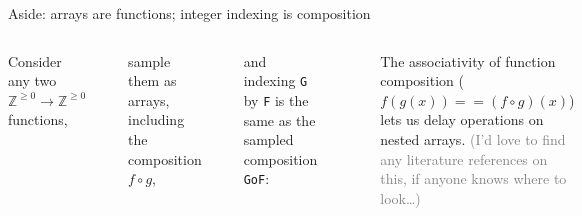 \documentclass[aspectratio=169]{beamer}
\begin{document}
\begin{frame}[fragile]{Aside: arrays are functions; integer indexing is composition}
\vspace{0.35 cm}
\begin{columns}
\small
Consider any two $\mathbb{Z}^{\ge 0} \to \mathbb{Z}^{\ge 0}$ functions,

\scriptsize
\vspace{-0.05 cm}
\begin{verbatim}
def f(x):
    return x**2 - 5*x + 10
def g(y):
    return max(0, 2*y - 10) + 3
\end{verbatim}

\small
\vspace{-0.05 cm}
sample them as arrays, including the composition $f \circ g$,

\scriptsize
\vspace{-0.05 cm}
\begin{verbatim}
F   = numpy.array([f(i) for i in range(10)])     # F is f at 10 elements
G   = numpy.array([g(i) for i in range(100)])    # G is g at 100 elements (to cover max(F))
GoF = numpy.array([g(f(i)) for i in range(10)])  # GoF is g∘f at 10 elements
\end{verbatim}

\small
\vspace{-0.05 cm}
and indexing \texttt{G} by \texttt{F} is the same as the sampled composition \texttt{GoF}:

\scriptsize
\vspace{-0.05 cm}
\begin{verbatim}
print("G\u2218F =", G[F])   # integer indexing (numpy.take)
print("g\u2218f =", GoF)    # array of the composed functions returns the same thing
\end{verbatim}

\vspace{-0.6 cm}
\begin{verbatim}
G∘F = [13  5  3  3  5 13 25 41 61 85]
g∘f = [13  5  3  3  5 13 25 41 61 85]
\end{verbatim}

\small
\vspace{-0.05 cm}
The associativity of function composition ($f(g(x)) == (f \circ g)(x)$) lets us delay operations on nested arrays. \textcolor{gray}{(I'd love to find any literature references on this, if anyone knows where to look\ldots)}
\end{columns}
\end{frame}
\end{document}
